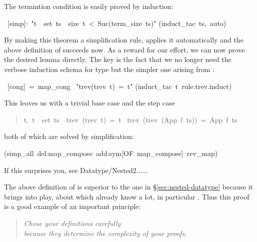 \begin{isabelle}%
%
\begin{isamarkuptext}%
\noindent
The termintion condition is easily proved by induction:%
\end{isamarkuptext}%
\ [simp]:\ {"}t\ {\isasymin}\ set\ ts\ {\isasymlongrightarrow}\ size\ t\ <\ Suc(term\_size\ ts){"}\isanewline
{}(induct\_tac\ ts,\ auto)%
\begin{isamarkuptext}%
\noindent
By making this theorem a simplification rule, 
applies it automatically and the above definition of 
succeeds now. As a reward for our effort, we can now prove the desired
lemma directly. The key is the fact that we no longer need the verbose
induction schema for type  but the simpler one arising from
:%
\end{isamarkuptext}%
\ [cong]\ =\ map\_cong\isanewline
{}\ {"}trev(trev\ t)\ =\ t{"}\isanewline
{}(induct\_tac\ t\ rule:trev.induct)%
\begin{isamarkuptxt}%
\noindent
This leaves us with a trivial base case  and the step case
\begin{quote}

\begin{isabelle}%
{\isasymforall}\mbox{t}.\ \mbox{t}\ {\isasymin}\ set\ \mbox{ts}\ {\isasymlongrightarrow}\ trev\ (trev\ \mbox{t})\ =\ \mbox{t}\ {\isasymLongrightarrow}\isanewline
trev\ (trev\ (App\ \mbox{f}\ \mbox{ts}))\ =\ App\ \mbox{f}\ \mbox{ts}
\end{isabelle}%

\end{quote}
both of which are solved by simplification:%
\end{isamarkuptxt}%
(simp\_all\ del:map\_compose\ add:sym[OF\ map\_compose]\ rev\_map)%
\begin{isamarkuptext}%
\noindent
If this surprises you, see Datatype/Nested2......

The above definition of  is superior to the one in \S\ref{sec:nested-datatype}
because it brings  into play, about which already know a lot, in particular
.
Thus this proof is a good example of an important principle:
\begin{quote}
\emph{Chose your definitions carefully\\
because they determine the complexity of your proofs.}
\end{quote}


\end{isamarkuptext}
\end{isabelle}
